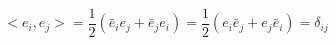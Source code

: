 \begin{equation}
<e_i,e_j>= \frac{1}{2} (\bar{e}_i e_j +\bar{e}_j e_i) =\frac{1}{2} (e_i \bar{e}_j + e_j \bar{e}_i)=\delta_{ij}
\end{equation}

